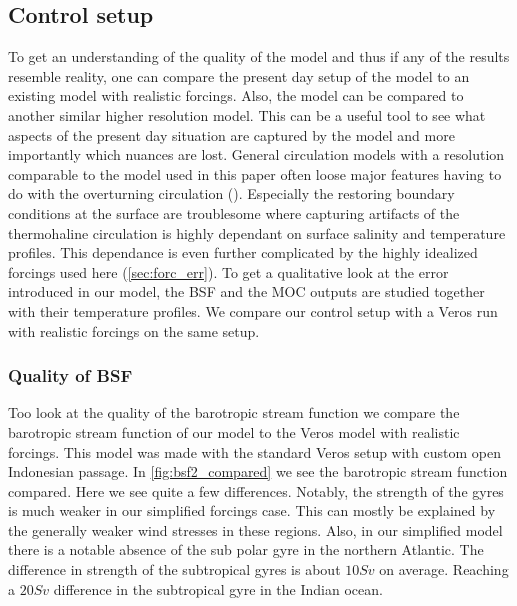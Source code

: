 \subsection{Control setup}

To get an understanding of the quality of the model and thus if any of the results resemble reality, one can compare the present day setup of the model to an existing model with realistic forcings. Also, the model can be compared to another similar higher resolution model. This can be a useful tool to see what aspects of the present day situation are captured by the model and more importantly which nuances are lost. General circulation models with a resolution comparable to the model used in this paper often loose major features having to do with the overturning circulation (\cite{stone1990limitations}). Especially the restoring boundary conditions at the surface are troublesome where capturing artifacts of the thermohaline circulation is highly dependant on surface salinity and temperature profiles. This dependance is even further complicated by the highly idealized forcings used here (\cref{sec:forc_err}). To get a qualitative look at the error introduced in our model, the BSF and the MOC outputs are studied together with their temperature profiles. We compare our control setup with a Veros run with realistic forcings on the same setup.


\subsubsection{Quality of BSF}
Too look at the quality of the barotropic stream function we compare the barotropic stream function of our model to the Veros model with realistic forcings. This model was made with the standard Veros setup with custom open Indonesian passage. In \cref{fig:bsf2_compared} we see the barotropic stream function compared. Here we see quite a few differences. Notably, the strength of the gyres is much weaker in our simplified forcings case. This can mostly be explained by the generally weaker wind stresses in these regions. Also, in our simplified model there is a notable absence of the sub polar gyre in the northern Atlantic. The difference in strength of the subtropical gyres is about $10Sv$ on average. Reaching a $20 Sv$ difference in the subtropical gyre in the Indian ocean. 




